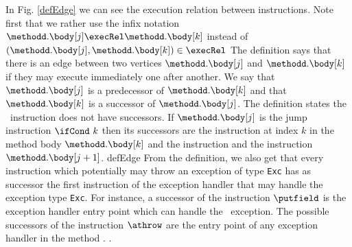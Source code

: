 In Fig. \ref{defEdge} we can see the execution relation between instructions.
Note first that we rather use the infix notation $\methodd.\body[j] \execRel \methodd.\body[k]$ instead of $(\methodd.\body[j], \methodd.\body[k]) \in \execRel$  %
 The definition says that there is an edge between two vertices $\methodd.\body[j]$ and  $\methodd.\body[k]$ if they may execute immediately one after another.
 We say that $\methodd.\body[j]$ is a predecessor of $\methodd.\body[k]$ and that  $\methodd.\body[k]$ is a successor of  $\methodd.\body[j]$.
 The definition states the \return \  instruction  does not have successors.
If  $\methodd.\body[j ]$ is the jump instruction $ \ifCond \ k $ then  its successors are the instruction at index $k$ in the method body   
$\methodd.\body[k]$ and the instruction and the instruction $\methodd.\body[j + 1 ]$. {defEdge}
From the definition, we also get that every instruction which potentially may throw an exception of type \texttt{Exc}
has as successor the first instruction of the exception handler that may handle the exception type \texttt{Exc}. For instance, a successor
of the instruction $\putfield$ is the exception handler entry point which can handle  the \NullPointerExc \ exception. 
The possible successors of the instruction $\athrow$ are the entry point of any  exception handler  in the method \methodd.
.
